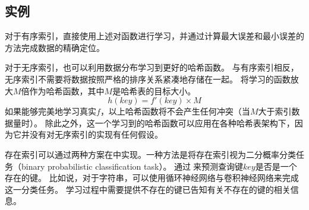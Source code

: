 
\subsection{{\li}实例}

对于有序索引，{\li}直接使用上述{\rmi}对{\cdf}函数进行学习，并通过计算最大误差和最小误差的方法完成数据的精确定位。

对于无序索引，{\li}也可以利用数据分布学习到更好的哈希函数。
与有序索引相反，无序索引不需要将数据按照严格的排序关系紧凑地存储在一起。
{\li}将学习的{\cdf}函数放大$M$倍作为哈希函数，其中$M$是哈希表的目标大小。
\[ h(key) = f'(key) \times M \]
如果{\rmi}能够完美地学习真实{\cdf}$f$，以上哈希函数将不会产生任何冲突（当$M$大于索引数据量时）。
除此之外，这一个学习到的哈希函数可以应用在各种哈希表架构下，因为它并没有对无序索引的实现有任何假设。



存在索引可以通过两种方案在{\li}中实现。一种方法是将存在索引视为二分概率分类任务（binary probabilistic classification task）。
通过{\model}来预测查询键$key$是否是一个存在的键。
比如说，对于字符串，{\li}可以使用循环神经网络与卷积神经网络来完成这一分类任务。
学习过程中需要提供不存在的键已告知{\model}有关不存在的键的相关信息。

